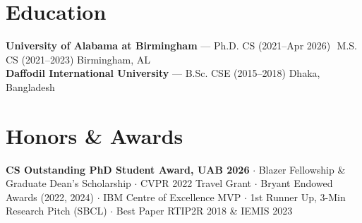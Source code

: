 \documentclass[10pt,letterpaper]{article}
\newcommand{\contactsep}{\,\textcolor{muted}{\textbar}\,}
\begin{document}
\section*{Education}
{\small
\textbf{University of Alabama at Birmingham} --- Ph.D. CS (2021--Apr 2026) \contactsep M.S. CS (2021--2023) \hfill Birmingham, AL\\
\textbf{Daffodil International University} --- B.Sc. CSE (2015--2018) \hfill Dhaka, Bangladesh
}
\section*{Honors \& Awards}
{\small\textbf{CS Outstanding PhD Student Award, UAB 2026} $\cdot$ Blazer Fellowship \& Graduate Dean's Scholarship $\cdot$ CVPR 2022 Travel Grant $\cdot$ Bryant Endowed Awards (2022, 2024) $\cdot$ IBM Centre of Excellence MVP $\cdot$ 1st Runner Up, 3-Min Research Pitch (SBCL) $\cdot$ Best Paper RTIP2R 2018 \& IEMIS 2023}
\end{document}

